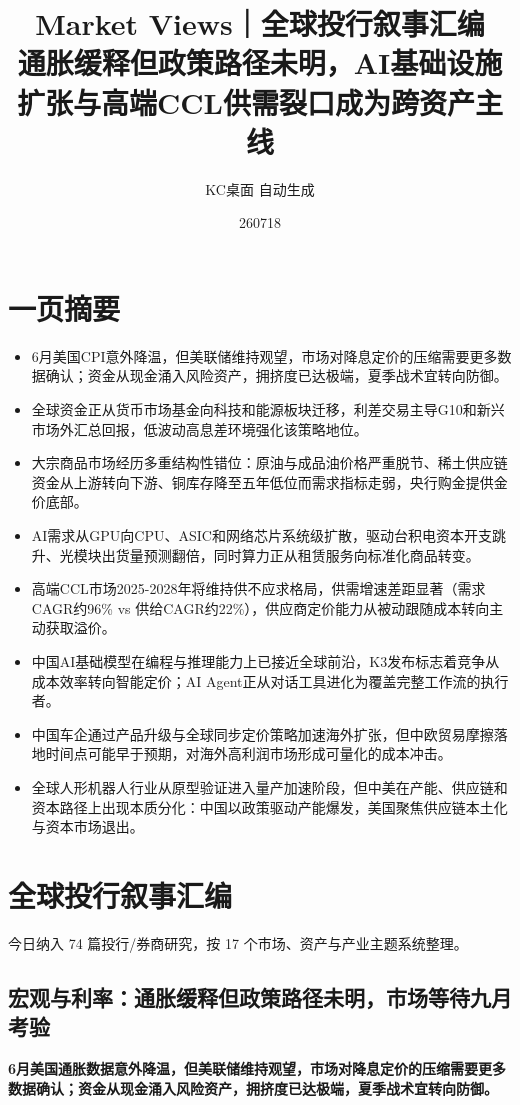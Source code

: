 \documentclass[11pt]{ctexart}
\title{\textbf{Market Views｜全球投行叙事汇编}\\[0.4em]{\large 通胀缓释但政策路径未明，AI基础设施扩张与高端CCL供需裂口成为跨资产主线}}
\author{KC桌面 自动生成}
\date{260718}
\begin{document}
\maketitle
\tableofcontents
\newpage
\section{一页摘要}
\begin{itemize}
  \item 6月美国CPI意外降温，但美联储维持观望，市场对降息定价的压缩需要更多数据确认；资金从现金涌入风险资产，拥挤度已达极端，夏季战术宜转向防御。
  \item 全球资金正从货币市场基金向科技和能源板块迁移，利差交易主导G10和新兴市场外汇总回报，低波动高息差环境强化该策略地位。
  \item 大宗商品市场经历多重结构性错位：原油与成品油价格严重脱节、稀土供应链资金从上游转向下游、铜库存降至五年低位而需求指标走弱，央行购金提供金价底部。
  \item AI需求从GPU向CPU、ASIC和网络芯片系统级扩散，驱动台积电资本开支跳升、光模块出货量预测翻倍，同时算力正从租赁服务向标准化商品转变。
  \item 高端CCL市场2025-2028年将维持供不应求格局，供需增速差距显著（需求CAGR约96\% vs 供给CAGR约22\%），供应商定价能力从被动跟随成本转向主动获取溢价。
  \item 中国AI基础模型在编程与推理能力上已接近全球前沿，K3发布标志着竞争从成本效率转向智能定价；AI Agent正从对话工具进化为覆盖完整工作流的执行者。
  \item 中国车企通过产品升级与全球同步定价策略加速海外扩张，但中欧贸易摩擦落地时间点可能早于预期，对海外高利润市场形成可量化的成本冲击。
  \item 全球人形机器人行业从原型验证进入量产加速阶段，但中美在产能、供应链和资本路径上出现本质分化：中国以政策驱动产能爆发，美国聚焦供应链本土化与资本市场退出。
\end{itemize}
\section{全球投行叙事汇编}
今日纳入 74 篇投行/券商研究，按 17 个市场、资产与产业主题系统整理。
\newpage
\subsection{宏观与利率：通胀缓释但政策路径未明，市场等待九月考验}
\textbf{6月美国通胀数据意外降温，但美联储维持观望，市场对降息定价的压缩需要更多数据确认；资金从现金涌入风险资产，拥挤度已达极端，夏季战术宜转向防御。}
\end{document}
